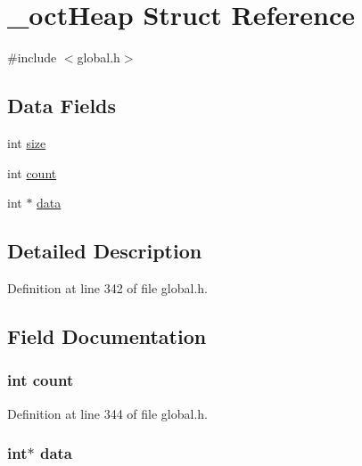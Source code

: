 \hypertarget{struct__octHeap}{\section{\-\_\-oct\-Heap Struct Reference}
\label{struct__octHeap}
}


{\ttfamily \#include $<$global.\-h$>$}

\subsection*{Data Fields}
\begin{DoxyCompactItemize}
\item 
int \hyperlink{struct__octHeap_a439227feff9d7f55384e8780cfc2eb82}{size}
\item 
int \hyperlink{struct__octHeap_ad43c3812e6d13e0518d9f8b8f463ffcf}{count}
\item 
int $\ast$ \hyperlink{struct__octHeap_ac103627c1ad15cbec2f22d0abe6d54b6}{data}
\end{DoxyCompactItemize}


\subsection{Detailed Description}


Definition at line 342 of file global.\-h.



\subsection{Field Documentation}
\hypertarget{struct__octHeap_ad43c3812e6d13e0518d9f8b8f463ffcf}{
\subsubsection[{count}]{\setlength{\rightskip}{0pt plus 5cm}int count}}\label{struct__octHeap_ad43c3812e6d13e0518d9f8b8f463ffcf}


Definition at line 344 of file global.\-h.

\hypertarget{struct__octHeap_ac103627c1ad15cbec2f22d0abe6d54b6}{
\subsubsection[{data}]{\setlength{\rightskip}{0pt plus 5cm}int$\ast$ data}}\label{struct__octHeap_ac103627c1ad15cbec2f22d0abe6d54b6}


